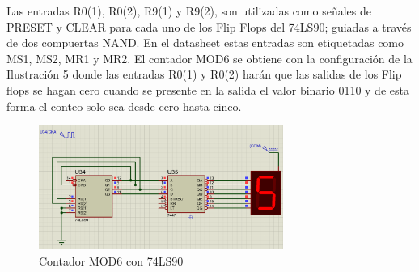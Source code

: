 Las  entradas  R0(1),  R0(2),  R9(1)  y  R9(2),  son  utilizadas  como  señales  de  PRESET  y CLEAR para cada uno de los Flip Flops del 74LS90; guiadas a través de dos compuertas NAND. En el datasheet estas entradas son etiquetadas como MS1, MS2, MR1 y MR2. 
\newline
El contador MOD6 se obtiene con la configuración de la Ilustración 5 donde las entradas R0(1) y R0(2) harán que las salidas de los Flip flops se hagan cero cuando se presente en la salida el valor binario 0110 y de esta forma el conteo solo sea desde cero hasta cinco.
\begin{figure}[h]
    \begin{center}
    \includegraphics[width=8cm]{images/image5.png}
    \newline
    \caption{Contador MOD6 con 74LS90}\label{cont_MOD6}
    \end{center}
\end{figure}
